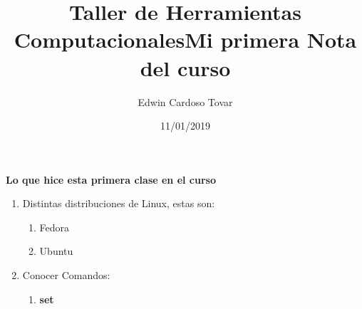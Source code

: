 \documentclass[letterpaper, 12pt, oneside]{article}%
\title{\Huge Taller de Herramientas Computacionales}
\author{Edwin Cardoso Tovar}
\date{11/01/2019}
\begin{document}
	\maketitle
    \newpage
    
    \title{\Huge Mi primera Nota del curso\\}
    
    \textbf{Lo que hice esta primera clase en el curso}
    
    \begin{enumerate}
    	\item Distintas distribuciones de Linux,
    	estas son:
    	\begin{enumerate}
    		\item Fedora
    		\item Ubuntu
    		
    	\end{enumerate}
    	\item Conocer Comandos:
    	\begin{enumerate}
    		\item \color{magenta}\textbf{set}
    		
    		
    	
    	\end{enumerate}
    \end{enumerate}
	
\end{document}
